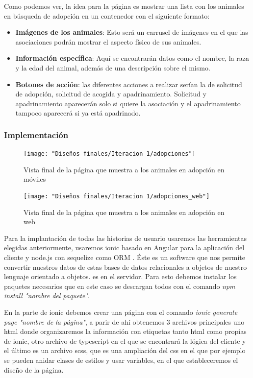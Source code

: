 Como podemos ver, la idea para la página es mostrar una lista con los animales en búsqueda de adopción en un contenedor con el siguiente formato:

\begin{itemize}
	\item \textbf{Imágenes de los animales}: Esto será un carrusel de imágenes en el que las asociaciones podrán mostrar el aspecto físico de sus animales.
	\item \textbf{Información específica}: Aquí se encontrarán datos como el nombre, la raza y la edad del animal, además de una descripción sobre el mismo.
	\item \textbf{Botones de acción}: las diferentes acciones a realizar serían la de solicitud de adopción, solicitud de acogida y apadrinamiento. Solicitud y apadrinamiento aparecerán solo si quiere la asociación y el apadrinamiento tampoco aparecerá si ya está apadrinado.
\end{itemize}

\subsubsection{Implementación} %

\begin{figure}[H]
	\centering
	\texttt{[image: "Diseños finales/Iteracion 1/adopciones"]}
	\caption{Vista final de la página que muestra a los animales en adopción en móviles}
	\label{fig:adopcionesDef}
\end{figure}


\begin{figure}[H]
	\centering
	\texttt{[image: "Diseños finales/Iteracion 1/adopciones\_web"]}
	\caption{Vista final de la página que muestra a los animales en adopción en web}
	\label{fig:adopcionesDefWeb}
\end{figure}
Para la implantación de todas las historias de usuario usaremos las herramientas elegidas anteriormente, usaremos ionic basado en Angular para la aplicación del cliente y node.js con sequelize como ORM \cite{orm}. Éste es un software que nos permite convertir nuestros datos de estas bases de datos relacionales a objetos de nuestro lenguaje orientado a objetos. es  en el servidor. Para esto debemos instalar los paquetes necesarios que en este caso se descargan todos con el comando \textit{npm install "nombre del paquete"}.

En la parte de ionic debemos crear una página con el comando \textit{ionic generate page "nombre de la página"}, a parir de ahí obtenemos 3 archivos principales uno html donde organizaremos la información con etiquetas tanto html como propias de ionic, otro archivo de typescript en el que se encontrará la lógica del cliente y el último es un archivo scss, que es una ampliación del css en el que por ejemplo se pueden anidar clases de estilos y usar variables, en el que estableceremos el diseño de la página.

